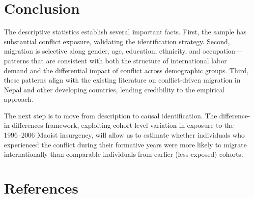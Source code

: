 \documentclass[12pt,letterpaper]{article}
\begin{document}
\section{Conclusion}

The descriptive statistics establish several important facts. First, the sample has substantial conflict exposure, validating the identification strategy. Second, migration is selective along gender, age, education, ethnicity, and occupation---patterns that are consistent with both the structure of international labor demand and the differential impact of conflict across demographic groups. Third, these patterns align with the existing literature on conflict-driven migration in Nepal and other developing countries, lending credibility to the empirical approach.

The next step is to move from description to causal identification. The difference-in-differences framework, exploiting cohort-level variation in exposure to the 1996--2006 Maoist insurgency, will allow us to estimate whether individuals who experienced the conflict during their formative years were more likely to migrate internationally than comparable individuals from earlier (less-exposed) cohorts.


\section*{References}
\end{document}
